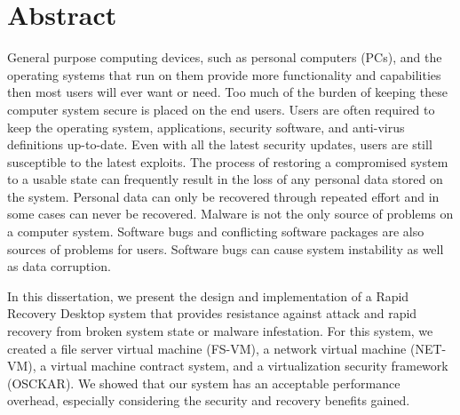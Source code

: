 
\section*{Abstract}

General purpose computing devices, such as personal computers (PCs), and the operating systems that run on them provide more functionality and capabilities then most users will ever want or need. Too much of the burden of keeping these computer system secure is placed on the end users. Users are often required to keep the operating system, applications, security software, and anti-virus definitions up-to-date. Even with all the latest security updates, users are still susceptible to the latest exploits. The process of restoring a compromised system to a usable state can frequently result in the loss of any personal data stored on the system. Personal data can only be recovered through repeated effort and in some cases can never be recovered. Malware is not the only source of problems on a computer system. Software bugs and conflicting software packages are also sources of problems for users. Software bugs can cause system instability as well as data corruption. 

In this dissertation, we present the design and implementation of a Rapid Recovery Desktop system that provides resistance against attack and rapid recovery from broken system state or malware infestation. For this system, we created a file server virtual machine (FS-VM), a network virtual machine (NET-VM), a virtual machine contract system, and a virtualization security framework (OSCKAR). We showed that our system has an acceptable performance overhead, especially considering the security and recovery benefits gained.


